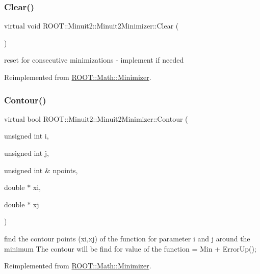 \subsubsection{\texorpdfstring{Clear()}{Clear()}\hspace{0.1cm}{\footnotesize\ttfamily [2/2]}}
{\footnotesize\ttfamily virtual void R\+O\+O\+T\+::\+Minuit2\+::\+Minuit2\+Minimizer\+::\+Clear (\begin{DoxyParamCaption}{ }\end{DoxyParamCaption})\hspace{0.3cm}{\ttfamily [virtual]}}



reset for consecutive minimizations -\/ implement if needed 



Reimplemented from \mbox{\hyperlink{classROOT_1_1Math_1_1Minimizer_ad7308846baecf68fb0dbc2d5e4caa178}{R\+O\+O\+T\+::\+Math\+::\+Minimizer}}.

\mbox{\label{classROOT_1_1Minuit2_1_1Minuit2Minimizer_a026780c27dd4b179817f826f49e36c8e}} 
\subsubsection{\texorpdfstring{Contour()}{Contour()}\hspace{0.1cm}{\footnotesize\ttfamily [1/2]}}
{\footnotesize\ttfamily virtual bool R\+O\+O\+T\+::\+Minuit2\+::\+Minuit2\+Minimizer\+::\+Contour (\begin{DoxyParamCaption}\item[{unsigned int}]{i,  }\item[{unsigned int}]{j,  }\item[{unsigned int \&}]{npoints,  }\item[{double $\ast$}]{xi,  }\item[{double $\ast$}]{xj }\end{DoxyParamCaption})\hspace{0.3cm}{\ttfamily [virtual]}}

find the contour points (xi,xj) of the function for parameter i and j around the minimum The contour will be find for value of the function = Min + Error\+Up(); 

Reimplemented from \mbox{\hyperlink{classROOT_1_1Math_1_1Minimizer_aeb8855190ff2e37911c38ed839f2043c}{R\+O\+O\+T\+::\+Math\+::\+Minimizer}}.

